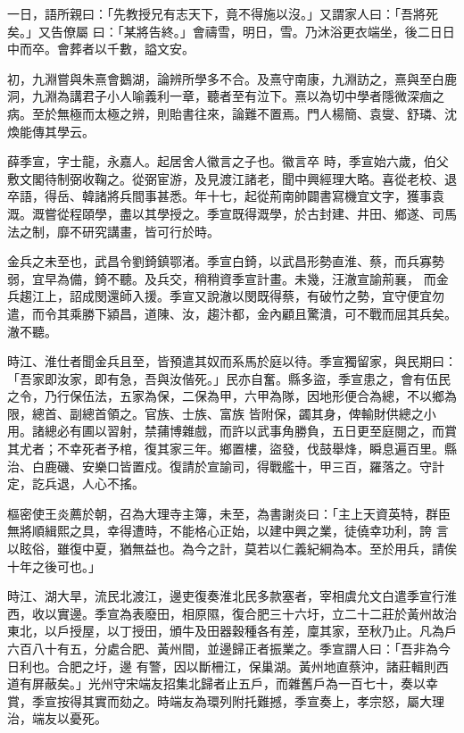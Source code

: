 \begin{pinyinscope}
 一日，語所親曰：「先教授兄有志天下，竟不得施以沒。」又謂家人曰：「吾將死矣。」又告僚屬
 曰：「某將告終。」會禱雪，明日，雪。乃沐浴更衣端坐，後二日日中而卒。會葬者以千數，謚文安。



 初，九淵嘗與朱熹會鵝湖，論辨所學多不合。及熹守南康，九淵訪之，熹與至白鹿洞，九淵為講君子小人喻義利一章，聽者至有泣下。熹以為切中學者隱微深痼之病。至於無極而太極之辨，則貽書往來，論難不置焉。門人楊簡、袁燮、舒璘、沈煥能傳其學云。



 薛季宣，字士龍，永嘉人。起居舍人徽言之子也。徽言卒
 時，季宣始六歲，伯父敷文閣待制弼收鞠之。從弼宦游，及見渡江諸老，聞中興經理大略。喜從老校、退卒語，得岳、韓諸將兵間事甚悉。年十七，起從荊南帥闢書寫機宜文字，獲事袁溉。溉嘗從程頤學，盡以其學授之。季宣既得溉學，於古封建、井田、鄉遂、司馬法之制，靡不研究講畫，皆可行於時。



 金兵之未至也，武昌令劉錡鎮鄂渚。季宣白錡，以武昌形勢直淮、蔡，而兵寡勢弱，宜早為備，錡不聽。及兵交，稍稍資季宣計畫。未幾，汪澈宣諭荊襄，
 而金兵趨江上，詔成閔還師入援。季宣又說澈以閔既得蔡，有破竹之勢，宜守便宜勿遣，而令其乘勝下潁昌，道陳、汝，趨汴都，金內顧且驚潰，可不戰而屈其兵矣。澈不聽。



 時江、淮仕者聞金兵且至，皆預遣其奴而系馬於庭以待。季宣獨留家，與民期曰：「吾家即汝家，即有急，吾與汝偕死。」民亦自奮。縣多盜，季宣患之，會有伍民之令，乃行保伍法，五家為保，二保為甲，六甲為隊，因地形便合為總，不以鄉為限，總首、副總首領之。官族、士族、富族
 皆附保，蠲其身，俾輸財供總之小用。諸總必有圃以習射，禁蒱博雜戲，而許以武事角勝負，五日更至庭閱之，而賞其尤者；不幸死者予棺，復其家三年。鄉置樓，盜發，伐鼓舉烽，瞬息遍百里。縣治、白鹿磯、安樂口皆置戍。復請於宣諭司，得戰艦十，甲三百，羅落之。守計定，訖兵退，人心不搖。



 樞密使王炎薦於朝，召為大理寺主簿，未至，為書謝炎曰：「主上天資英特，群臣無將順緝熙之具，幸得遭時，不能格心正始，以建中興之業，徒僥幸功利，誇
 言以眩俗，雖復中夏，猶無益也。為今之計，莫若以仁義紀綱為本。至於用兵，請俟十年之後可也。」



 時江、湖大旱，流民北渡江，邊吏復奏淮北民多款塞者，宰相虞允文白遣季宣行淮西，收以實邊。季宣為表廢田，相原隰，復合肥三十六圩，立二十二莊於黃州故治東北，以戶授屋，以丁授田，頒牛及田器穀種各有差，廩其家，至秋乃止。凡為戶六百八十有五，分處合肥、黃州間，並邊歸正者振業之。季宣謂人曰：「吾非為今日利也。合肥之圩，邊
 有警，因以斷柵江，保巢湖。黃州地直蔡沖，諸莊輯則西道有屏蔽矣。」光州守宋端友招集北歸者止五戶，而雜舊戶為一百七十，奏以幸賞，季宣按得其實而劾之。時端友為環列附托難撼，季宣奏上，孝宗怒，屬大理治，端友以憂死。




\end{pinyinscope}
